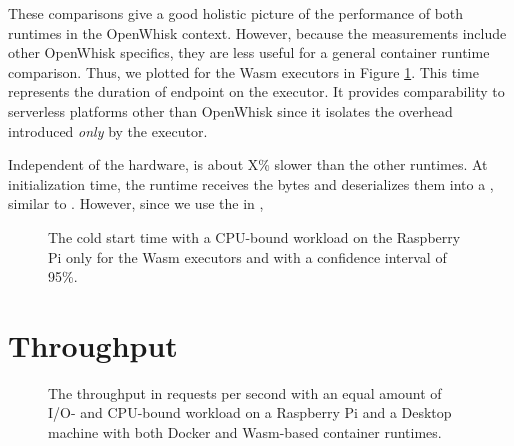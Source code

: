 These comparisons give a good holistic picture of the performance of both runtimes in the OpenWhisk context. However, because the measurements include other OpenWhisk specifics, they are less useful for a general container runtime comparison. Thus, we plotted  for the Wasm executors in Figure \ref{fig:pc-pi-cold-start-wasm-only}. This time represents the duration of  endpoint on the executor. It provides comparability to serverless platforms other than OpenWhisk since it isolates the overhead introduced \emph{only} by the executor.

Independent of the hardware,  is about X\% slower than the other runtimes. At initialization time, the runtime receives the bytes and deserializes them into a , similar to . However, since we use the  in , 

\begin{figure}
    \begin{center}
        
    \end{center}
    \caption{The cold start time with a CPU-bound workload on the Raspberry Pi only for the Wasm executors and with a confidence interval of 95\%.}
    \label{fig:pc-pi-cold-start-wasm-only}
\end{figure}



\section{Throughput}

\begin{figure}
    \begin{center}
        
    \end{center}
    \caption{The throughput in requests per second with an equal amount of I/O- and CPU-bound workload on a Raspberry Pi and a Desktop machine with both Docker and Wasm-based container runtimes.}
    \label{fig:pi-pc-load-mixed}
\end{figure}

